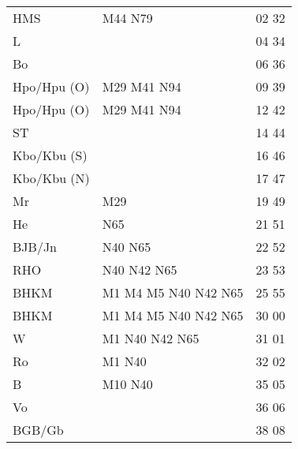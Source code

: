 \begin{tabular}{!{\color{schiefergrau}\vrule width 3pt}*{3}{l!{\color{schiefergrau}\vrule width 3pt}}}
\hline
{}
 \\
\hline
HMS          & \mbus{} M44 \nbus{} N79                                    & 02 32 \\
L            &                                                            & 04 34 \\
Bo           &                                                            & 06 36 \\
Hpo/Hpu (O)  & \nusieben{} \mbus{} M29 M41 \nbus{} N94                    & 09 39 \\
\hline
Hpo/Hpu (O)  & \nusieben{} \mbus{} M29 M41 \nbus{} N94                    & 12 42 \\
ST           &                                                            & 14 44 \\
Kbo/Kbu (S)  & \nueins{}                                                  & 16 46 \\
Kbo/Kbu (N)  & \nueins{}                                                  & 17 47 \\
Mr           & \mbus{} M29                                                & 19 49 \\
He           & \nbus{} N65                                                & 21 51 \\
BJB/Jn       & \nbus{} N40 N65                                            & 22 52 \\
RHO          & \nuzwei{} \nbus{} N40 N42 N65                              & 23 53 \\
BHKM         & \nuzwei{} \nufuenf{} \mtram{} M1 M4 M5 \nbus{} N40 N42 N65 & 25 55 \\
\hline
BHKM         & \nuzwei{} \nufuenf{} \mtram{} M1 M4 M5 \nbus{} N40 N42 N65 & 30 00 \\
W            & \nuzwei{} \nufuenf{} \mtram{} M1 \nbus{} N40 N42 N65       & 31 01 \\
Ro           & \mtram{} M1 \nbus{} N40                                    & 32 02 \\
B            & \mtram{} M10 \nbus{} N40                                   & 35 05 \\
Vo           &                                                            & 36 06 \\
BGB/Gb       &                                                            & 38 08 \\

\end{tabular}
